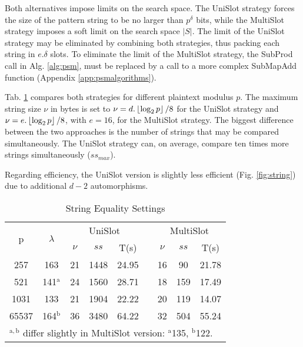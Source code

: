 Both alternatives impose limits on the search space. The UniSlot strategy forces the size of the pattern string to be no larger than $p^{\delta}$ bits, while the MultiSlot strategy imposes a soft limit on the search space $|S|$. The limit of the UniSlot strategy may be eliminated by combining both strategies, thus packing each string in $e.\delta$ slots. To eliminate the limit of the MultiSlot strategy, the {\sc SubProd} call in Alg. \ref{alg:psm}, must be replaced by a call to a more complex {\sc SubMapAdd} function (Appendix \ref{app:psmalgorithms}).


Tab. \ref{tab:string} compares both strategies for different plaintext modulus $p$. The maximum string size $\nu$ in bytes is set to $\nu=d.\left\lfloor \log_2{p} \right\rfloor/8$ for the UniSlot strategy and $\nu=e.\left\lfloor \log_2{p} \right\rfloor/8$, with $e=16$, for the MultiSlot strategy. The biggest difference between the two approaches is the number of strings that may be compared simultaneously. The UniSlot strategy can, on average, compare ten times more strings simultaneously ($ss_{max}$). 

Regarding efficiency, the UniSlot version is slightly less efficient (Fig. \ref{fig:string}) due to additional $d-2$ automorphisms.

\begin{table}[htbp]
\setlength\tabcolsep{3pt}
\caption{String Equality Settings}
\begin{center}
\begin{tabular}{ccccccccc}
\hline
\multirow{2}{1em}{p} &  \multirow{2}{1em}{$\lambda$} &  \multicolumn{3}{c}{UniSlot} & & \multicolumn{3}{c}{MultiSlot} \\ \cline{3-5} \cline{7-9}
&& $\nu$ & $ss$ & T(s) & & $\nu$ & $ss$ & T(s) \\ \hline
257 &  163 &  21 & 1448 & 24.95 & & 16 & 90 & 21.78\\
521 &  141$^{\mathrm{a}}$&  24 & 1560 & 28.71 & & 18 & 159 & 17.49 \\
1031 &  133 &  21 & 1904 & 22.22 & & 20 & 119 & 14.07 \\
65537 &  164$^{\mathrm{b}}$ &  36 & 3480 & 64.22 & & 32 & 504 & 55.24 \\
\hline
\multicolumn{9}{l}{$^\mathrm{a,b}$ differ slightly in MultiSlot version: $^{\mathrm{a}}$135, $^{\mathrm{b}}$122.}
\end{tabular}
\label{tab:string}
\end{center}
\end{table}


